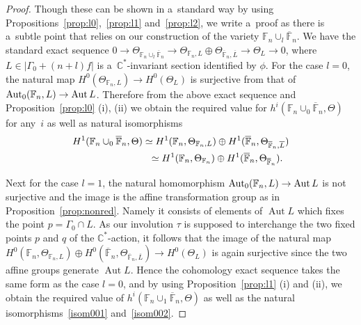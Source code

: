 \documentclass[pdftex]{sigma}
\numberwithin{equation}{section}
\DeclareMathOperator{\Aut}{Aut}
\begin{document}
\begin{proof}
Though these can be shown in a~standard way by using Propositions~\ref{prop:l0},~\ref{prop:l1} and~\ref{prop:l2}, we
write a~proof as there is a~subtle point that relies on our construction of the variety
$\mathbb{F}_n\cup_l\overline{\mathbb{F}}_n$.
We have the standard exact sequence $0 \to \Theta_{\mathbb{F}_n\cup_l \overline{\mathbb{F}}_n} \to
\Theta_{\mathbb{F}_n,L}\oplus\Theta_{\overline{\mathbb{F}}_n,\overline L}\to \Theta_L\to 0$, where $L\in
|\Gamma_0+(n+l)f|$ is a~$\mathbb{C}^*$-invariant section identif\/ied by $\phi$.
For the case $l=0$, the natural map $H^0(\Theta_{\mathbb{F}_n,L}) \to H^0(\Theta_{L})$ is surjective from that of
${\rm{Aut}}_0(\mathbb{F}_n,L)\to \Aut L$.
Therefore from the above exact sequence and Proposition~\ref{prop:l0} (i), (ii) we obtain the required value for $h^i
(\mathbb{F}_n \cup_0 \overline{\mathbb{F}}_n,\Theta)$ for any~$i$ as well as natural isomorphisms {\samepage
\begin{gather}
H^1(\mathbb{F}_n \cup_0 \overline{\mathbb{F}}_n,\Theta)  \simeq H^1(\mathbb{F}_n, \Theta_{\mathbb{F}_n,L}) \oplus H^1
(\overline{\mathbb{F}}_n,\Theta_{\overline{\mathbb{F}}_n,\overline L})
\label{isom001}
\\
\hphantom{H^1(\mathbb{F}_n \cup_0 \overline{\mathbb{F}}_n,\Theta)}{}
\simeq H^1(\mathbb{F}_n, \Theta_{\mathbb{F}_n}) \oplus H^1 (\overline{\mathbb{F}}_n,\Theta_{\overline{\mathbb{F}}_n}).
\label{isom002}
\end{gather}}

\noindent
Next  for the case $l=1$, the natural homomorphism ${\rm{Aut}}_0(\mathbb{F}_n,L)\to \Aut L$ is not surjective and the
image is the af\/f\/ine transformation group as in Proposition~\ref{prop:nonred}.
Namely it consists of elements of $\Aut L$ which f\/ixes the point $p=\Gamma_0\cap L$.
As our involution $\tau$ is supposed to interchange the two f\/ixed points $p$ and $q$ of the $\mathbb{C}^*$-action, it
follows that the image of the natural map $H^0(\mathbb{F}_n, \Theta_{\mathbb{F}_n,L}) \oplus H^0
(\overline{\mathbb{F}}_n,\Theta_{\overline{\mathbb{F}}_n,\overline L})\to H^0(\Theta_L)$ is again surjective since the
two af\/f\/ine groups generate $\Aut L$.
Hence the cohomology exact sequence takes the same form as the case $l=0$, and by using Proposition~\ref{prop:l1} (i)
and (ii), we obtain the required value of $h^i (\mathbb{F}_n \cup_1 \overline{\mathbb{F}}_n,\Theta)$ as well as the
natural isomorphisms~\eqref{isom001} and~\eqref{isom002}.


\end{proof}
\end{document}
